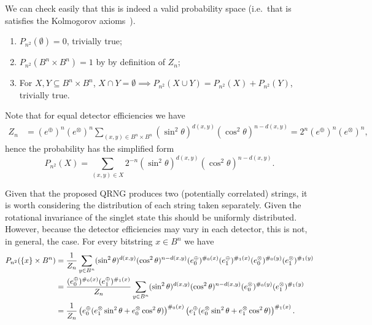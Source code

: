 \documentclass{mscs}
\newtheorem{Fact}[Theorem]{Fact}
\begin{document}
We can check easily that this is indeed a valid probability space (i.e.\ that is satisfies the Kolmogorov axioms~\citep{Billingsley:1979aa}).
\begin{enumerate}
	\item $P_{n^2}(\emptyset) = 0$, trivially true;
	\item $P_{n^2}(B^n\times B^n) = 1$ by by definition of $Z_n$;
	\item For $X,Y\subseteq B^n\times B^n$, $X\cap Y=\emptyset \implies P_{n^2}(X \cup Y) = P_{n^2}(X) + P_{n^2}(Y)$, trivially true.
\end{enumerate}
\fi
Note that for equal detector efficiencies we have
\begin{align*}
	Z_n&=(e^\oplus)^n(e^\otimes)^n\sum_{(x,y)\in B^n\times B^n}(\sin^2\theta)^{d(x,y)}(\cos^2\theta)^{n-d(x,y)}=2^n(e^\oplus)^n(e^\otimes)^n,
\end{align*}
hence the probability has the simplified form
$$P_{n^2}(X)=\sum_{(x,y)\in X}2^{-n}(\sin^2\theta)^{d(x,y)}(\cos^2\theta)^{n-d(x,y)}.$$

Given that the proposed QRNG produces two (potentially correlated) strings, it is worth considering the distribution of each string taken separately. Given the rotational invariance of the singlet state this should be uniformly distributed. However, because the detector efficiencies may vary in each detector, this is not, in general, the case.
	For every bitstring $x\in B^n$ we have
	\begin{align}
		P_{n^2}(\{x\} \times B^n) &= \frac{1}{Z_n}\sum_{y\in B^n}(\sin^2\theta)^{d(x,y)}(\cos^2\theta)^{n-d(x,y)}(e_0^\oplus)^{\#_0(x)}(e_1^\oplus)^{\#_1(x)}(e_0^\otimes)^{\#_0(y)}(e_1^\otimes)^{\#_1(y)}\notag\\
		&= \frac{(e_0^\oplus)^{\#_0(x)}(e_1^\oplus)^{\#_1(x)}}{Z_n}\sum_{y\in B^n}(\sin^2\theta)^{d(x,y)}(\cos^2\theta)^{n-d(x,y)}(e_0^\otimes)^{\#_0(y)}(e_1^\otimes)^{\#_1(y)}\notag\\
		&= \frac{1}{Z_n}\left(e_0^\oplus (e_1^\otimes\sin^2\theta+e_0^\otimes\cos^2\theta) \right)^{\#_0(x)}\left( e_1^\oplus (e_0^\otimes\sin^2\theta+e_1^\otimes\cos^2\theta) \right)^{\#_1(x)}.\label{discardOneStrDis}
	\end{align}
\end{document}
